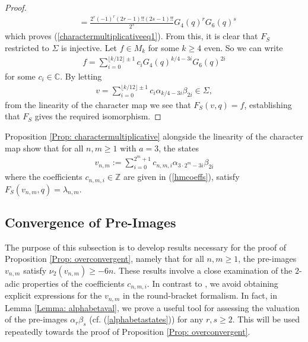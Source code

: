 \documentclass[10pt,a4paper]{amsart}
\numberwithin{equation}{section}
\theoremstyle{definition}
\newcommand{\Heis}{S}
\newcommand{\haupt}{\lambda}
\begin{document}
\begin{proof}
\begin{align*}
        &= \frac{2^{r}(-1)^{r}(2r-1)!!(2s-1)!!}{2^{s}} G_{4}(q)^{r}G_{6}(q)^{s}
    \end{align*}
    which proves (\ref{charactermultiplicativeeq1}). From this, it is clear that $F_{\Heis}$ restricted to $\Sigma$ is injective. Let $f \in M_{k}$ for some $k \geq 4$ even. So we can write
    \begin{align*}
        f = \sum_{i=0}^{\lfloor k/12 \rfloor \pm 1 } c_{i} G_{4}(q)^{k/4-3i} G_{6}(q)^{2i}
    \end{align*}
    for some $c_{i} \in \mathbb{C}$. By letting
    \begin{align*}
        v = \sum_{i=0}^{\lfloor k/12 \rfloor \pm 1 } c_{i} \alpha_{k/4-3i} \beta_{2i} \in \Sigma,
    \end{align*}
    from the linearity of the character map we see that $F_{\Heis}(v,q) = f$, establishing that $F_{\Heis}$ gives the required isomorphism.
\end{proof}

Proposition \ref{Prop: charactermultiplicative} alongside the linearity of the character map show that for all $n,m \geq 1$ with $a=3$, the states
\begin{align}
    v_{n,m} := \sum_{i=0}^{2^{m} +1} c_{n,m,i} \alpha_{3\cdot 2^{m} - 3i} \beta_{2i}
\end{align}
where the coefficients $c_{n,m,i} \in \mathbb{Z}$ are given in (\ref{hmcoeffs}), satisfy $F_{\Heis}(v_{n,m},q) = \haupt_{n,m}$. \par 

\subsection{Convergence of Pre-Images} \label{Subsection: Convergence of Pre-Images}

The purpose of this subsection is to develop results necessary for the proof of Proposition \ref{Prop: overconvergent}, namely that for all $n,m \geq 1$, the pre-images $v_{n,m}$ satisfy $\nu_{2}(v_{n,m}) \geq -6n$. These results involve a close examination of the $2$-adic properties of the coefficients $c_{n,m,i}$. In contrast to \cite{BF24,FM23a,FM23}, we avoid obtaining explicit expressions for the $v_{n,m}$ in the round-bracket formalism. In fact, in Lemma \ref{Lemma: alphabetaval}, we prove a useful tool for assessing the valuation of the pre-images $\alpha_{r}\beta_{s}$ (cf. (\ref{alphabetastates})) for any $r,s \geq 2$. This will be used repeatedly towards the proof of Proposition \ref{Prop: overconvergent}.
\end{document}
